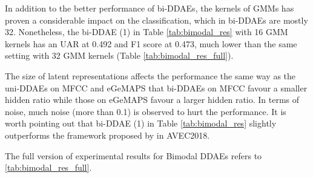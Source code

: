 In addition to the better performance of bi-DDAEs, the kernels of GMMs has proven a considerable impact on the classification, which in bi-DDAEs are mostly 32. Nonetheless, the bi-DDAE (1) in Table \ref{tab:bimodal_res} with 16 GMM kernels has an UAR at 0.492 and F1 score at 0.473, much lower than the same setting with 32 GMM kernels (Table \ref{tab:bimodal_res_full}). 

The size of latent representations affects the performance the same way as the uni-DDAEs on MFCC and eGeMAPS that bi-DDAEs on MFCC favour a smaller hidden ratio while those on eGeMAPS favour a larger hidden ratio. In terms of noise, much noise (more than 0.1) is observed to hurt the performance. It is worth pointing out that bi-DDAE (1) in Table \ref{tab:bimodal_res} slightly outperforms the framework proposed by \cite{syed2018} in AVEC2018.

The full version of experimental results for Bimodal DDAEs refers to \ref{tab:bimodal_res_full}.

